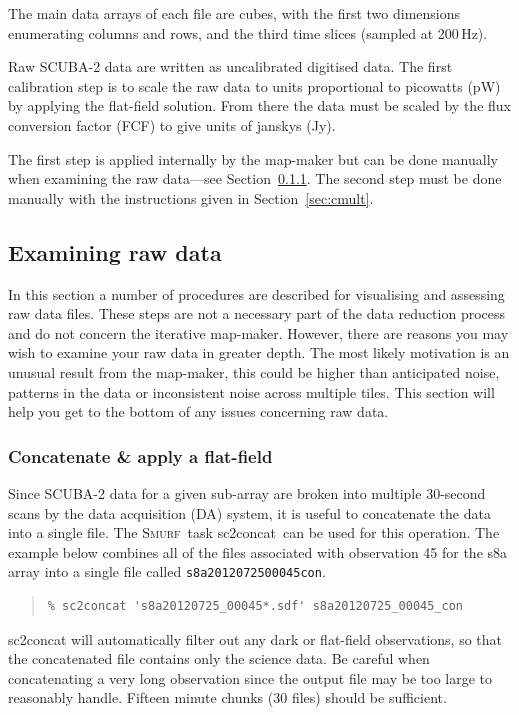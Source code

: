 \documentclass[twoside,11pt]{article}
\newcommand{\htmlref}[2]{#1}
\newcommand{\latexhtml}[2]{#1}
\newcommand{\xref}[3]{#1}
\newcommand{\xlabel}[1]{}
\renewcommand{\_}{\texttt{\symbol{95}}}
\newenvironment{myquote}{\begin{quote}\begin{small}}{\end{small}\end{quote}}
\newcommand{\smurf}{\xref{\textsc{Smurf}}{sun258}{}}
\newcommand{\task}[1]{\textsf{#1}}
\newcommand{\concat}{\xref{\task{sc2concat}}{sun258}{SC2CONCAT}}
\newcommand{\cref}[3]{\latexhtml{#1~\ref{#2}}{\htmlref{#3}{#2}}}
\begin{document}
The main data arrays of each file are cubes, with the first two
dimensions enumerating columns and rows, and the third time slices
(sampled at 200\,Hz).

Raw SCUBA-2 data are written as uncalibrated digitised data. The first calibration
step is to scale the raw data to units proportional to picowatts (pW)
by applying the flat-field solution. From there the data must be
scaled by the flux conversion factor (FCF) to give units of janskys
(Jy).

The first step is applied internally by the map-maker but can be done
manually when examining the raw data---see
\cref{Section}{sec:concat}{Concatenate \& apply a flat-field}.
The second step must be done manually with the instructions given in
\cref{Section}{sec:cmult}{Applying the FCF and determining fluxes}.


\subsection{\xlabel{examine}Examining raw data}
\label{sec:exam}

In this section a number of procedures are described for visualising
and assessing raw data files. These steps are not a necessary part of
the data reduction process and do not concern the iterative map-maker.
However, there are reasons you may wish to examine your raw data in
greater depth. The most likely motivation is an unusual result from the
map-maker, this could be higher than anticipated noise, patterns in
the data or inconsistent noise across multiple tiles. This section
will help you get to the bottom of any issues concerning raw data.

\subsubsection{\xlabel{concat}Concatenate \& apply a flat-field}
\label{sec:concat}

Since SCUBA-2 data for a given sub-array are broken into multiple
30-second scans by the data acquisition (DA) system, it is useful to
concatenate the data into a single file. The \smurf\ task \concat\ can
be used for this operation. The example below combines all of the
files associated with observation 45 for the s8a array into a single
file called \texttt{s8a20120725\_00045\_con}.

\begin{myquote}
\begin{verbatim}
% sc2concat 's8a20120725_00045*.sdf' s8a20120725_00045_con
\end{verbatim}
\end{myquote}
\task{sc2concat} will automatically filter out any dark or flat-field
observations, so that the concatenated file contains only the science
data. Be careful when concatenating a very long observation since the
output file may be too large to reasonably handle. Fifteen minute
chunks (30 files) should be sufficient.
\end{document}
